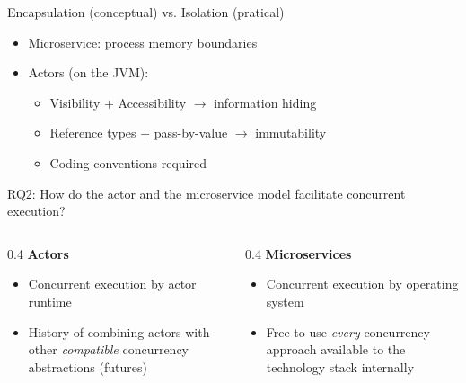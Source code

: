 \documentclass{beamer}
\begin{document}

\begin{frame}{Encapsulation (conceptual) vs. Isolation (pratical)}

\begin{itemize}
  \item Microservice: process memory boundaries
  \item Actors (on the JVM):
  \begin{itemize}
    \item Visibility $+$ Accessibility $\rightarrow$ information hiding
    \item Reference types $+$ pass-by-value $\rightarrow$ immutability
    \item Coding conventions required
  \end{itemize}
\end{itemize}

\end{frame}


\begin{frame}{RQ2: How do the actor and the microservice model facilitate concurrent execution?}

\begin{columns}
  \begin{column} {0.4\textwidth} 
    \textbf{Actors}
    \begin{itemize}
      \item Concurrent execution by actor runtime
      \item History of combining actors with other \textit{compatible} concurrency abstractions (futures)
    \end{itemize}
  \end{column}
  \begin{column} {0.4\textwidth}
    \textbf{Microservices} \\
    \begin{itemize}
      \item Concurrent execution by operating system
      \item Free to use \textit{every} concurrency approach available to the technology stack internally
    \end{itemize}
  \end{column}
\end{columns}

\end{frame}
\end{document}
